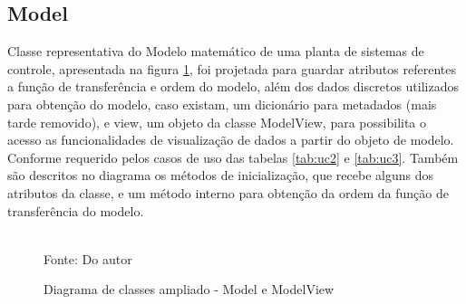 \subsection{Model}

Classe representativa do Modelo matemático de uma planta de sistemas de controle, apresentada na figura
\ref{fig:class_diag_model}, foi projetada para guardar atributos
referentes a função de transferência e ordem do modelo, além dos dados discretos utilizados para obtenção do modelo,
caso existam, um dicionário para metadados (mais tarde removido), e view, um objeto da classe ModelView, para
possibilita o acesso as funcionalidades de visualização de dados a partir do objeto de modelo.
Conforme requerido pelos casos de uso das tabelas \ref{tab:uc2} e \ref{tab:uc3}.
Também são descritos no diagrama os métodos de inicialização, que recebe alguns dos atributos da classe, e um método
interno para obtenção da ordem da função de transferência do modelo.

\begin{figure}[H]
    \centering
    \caption{Diagrama de classes ampliado - Model e ModelView}
    \label{fig:class_diag_model}
    \\
    \vspace{0cm}\hspace{0cm}\small{Fonte: Do autor}
\end{figure}

